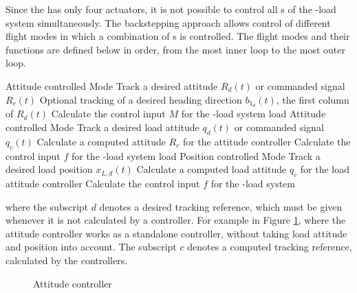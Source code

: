 Since the  has only four actuators, it is not possible to control all s of the -load system simultaneously. The backstepping approach allows control of different flight modes in which a combination of s is controlled. The flight modes and their functions are defined below in order, from the most inner loop to the most outer loop.
\begin{outline}
	\1  Attitude controlled Mode 
	\2 Track a desired  attitude $ R_d(t) $ or commanded signal $ R_c(t) $
	\2Optional tracking of a desired heading direction $ b_{1_d}(t) $, the first column of $ R_d(t) $
	\2 Calculate the control input $ M $ for the -load system
	\1 load Attitude controlled Mode 
	\2 Track a desired load attitude $ q_d(t) $ or commanded signal $ q_c(t) $
	\2 Calculate a computed  attitude $ R_c $ for the  attitude controller
	\2 Calculate the control input $ f $ for the -load system	
	\1 load Position controlled Mode
	\2 Track a desired load position $ x_{L,d}(t) $
	\2 Calculate a computed load attitude $ q_c $ for the load attitude controller
	\2 Calculate the control input $ f $ for the -load system		
\end{outline}
where the subscript $d $ denotes a desired tracking reference, which must be given whenever it is not calculated by a controller. For example in Figure \ref{fig:con.qrattalone}, where the  attitude controller works as a standalone controller, without taking load attitude and position into account.
The subscript $ c $ denotes a computed tracking reference, calculated by the controllers. 
\begin{figure}[h!]
	\centering
	\caption{ Attitude controller\label{fig:con.qrattalone}}
\end{figure}		



